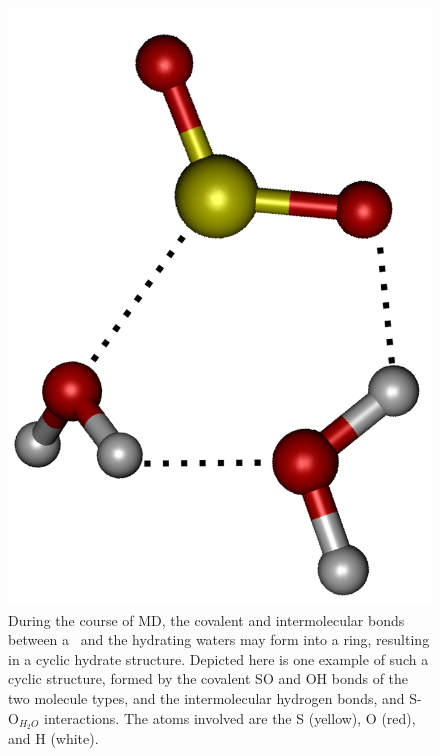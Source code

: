 \begin{figure}[h!]
	\begin{center}
		\includegraphics[scale=1.0]{images/cycles/double-cycle-type2-small.png}
		\caption{During the course of MD, the covalent and intermolecular bonds between a \suldiox~and the hydrating waters may form into a ring, resulting in a cyclic hydrate structure. Depicted here is one example of such a cyclic structure, formed by the covalent SO and OH bonds of the two molecule types, and the intermolecular hydrogen bonds, and S-O$_{H_2O}$ interactions. The atoms involved are the S (yellow), O (red), and H (white).}
		\label{fig:cyclic-example}
	\end{center}
\end{figure}

